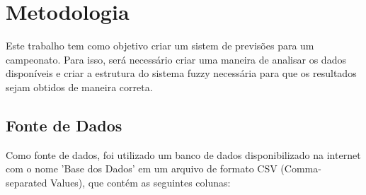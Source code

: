 \documentclass[conference]{IEEEtran}
\begin{document}
\section{Metodologia}
\indent Este trabalho tem como objetivo criar um sistem de previsões para um 
campeonato. Para isso, será necessário criar uma maneira de analisar os dados 
disponíveis e criar a estrutura do sistema fuzzy necessária para que os 
resultados sejam obtidos de maneira correta.\\

\subsection{Fonte de Dados}
\indent Como fonte de dados, foi utilizado um banco de dados disponibilizado na 
internet com o nome 'Base dos Dados' em um arquivo de formato CSV 
(Comma-separated Values), que contém as seguintes colunas:
\end{document}
